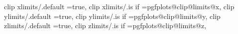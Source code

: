 {{{{{{{{{{{clip xlimits/.default                                              =true,                                                                                                                              
clip xlimits/.is if                                                =pgfplots@clip@limits@x,                                                                                                            
clip ylimits/.default                                              =true,                                                                                                                              
clip ylimits/.is if                                                =pgfplots@clip@limits@y,                                                                                                            
clip zlimits/.default                                              =true,                                                                                                                              
clip zlimits/.is if                                                =pgfplots@clip@limits@z,                                                                                                            


}}}}}}}}}}}
